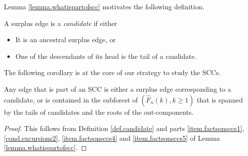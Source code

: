 Lemma \ref{lemma.whatispartofscc} motivates the following definition.
\begin{definition}\label{def.candidate}
A surplus edge is a \emph{candidate} if either
\begin{itemize}
    \item It is an ancestral surplus edge, or
    \item One of the descendants of its head is the tail of a candidate.
\end{itemize}
\end{definition}
The following corollary is at the core of our strategy to study the SCCs.
\begin{corollary}\label{cor.edgesinSCCs}
Any edge that is part of an SCC is either a surplus edge corresponding to a candidate, or is contained in the subforest of $(\hat{F}_n(k),k\geq 1)$ that is spanned by the tails of candidates and the roots of the out-components.
\end{corollary}
\begin{proof}
This follows from Definition \ref{def.candidate} and parts \ref{item.factsonsccs1}, \ref{cond.excursions2}, \ref{item.factsonsccs4} and \ref{item.factsonsccs5} of Lemma \ref{lemma.whatispartofscc}.
\end{proof}
